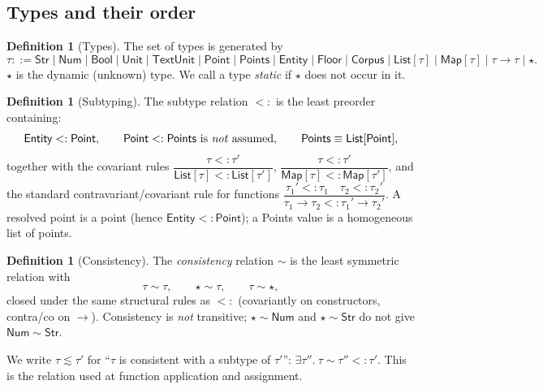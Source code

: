 \documentclass[11pt,a4paper]{article}
\theoremstyle{plain}
\theoremstyle{definition}
\newtheorem{definition}[theorem]{Definition}
\theoremstyle{remark}
\newcommand{\dyn}{\star}                                  %
\newcommand{\subtype}{<:}
\newcommand{\consistent}{\sim}
\newcommand{\jspace}{\qquad}
\begin{document}
\subsection{Types and their order}

\begin{definition}[Types]
\label{def:types}
The set of types is generated by
\[
\tau ::= \mathsf{Str}\mid\mathsf{Num}\mid\mathsf{Bool}\mid\mathsf{Unit}
        \mid \mathsf{TextUnit} \mid \mathsf{Point}\mid\mathsf{Points}
        \mid\mathsf{Entity}\mid\mathsf{Floor}\mid\mathsf{Corpus}
        \mid \mathsf{List}[\tau]\mid\mathsf{Map}[\tau]\mid \tau\to\tau \mid
        \dyn.
\]
$\dyn$ is the dynamic (unknown) type. We call a type \emph{static} if $\dyn$
does not occur in it.
\end{definition}

\begin{definition}[Subtyping]
\label{def:subtype}
The subtype relation $\subtype$ is the least preorder containing:
\[
\mathsf{Entity}\subtype\mathsf{Point}, \jspace
\mathsf{Point}\subtype\mathsf{Points}\ \text{is \emph{not} assumed},\jspace
\mathsf{Points} \equiv \mathsf{List}[\mathsf{Point}],
\]
together with the covariant rules
$\dfrac{\tau\subtype\tau'}{\mathsf{List}[\tau]\subtype\mathsf{List}[\tau']}$,
$\dfrac{\tau\subtype\tau'}{\mathsf{Map}[\tau]\subtype\mathsf{Map}[\tau']}$, and
the standard contravariant/covariant rule for functions
$\dfrac{\tau_1'\subtype\tau_1 \quad \tau_2\subtype\tau_2'}
       {\tau_1\to\tau_2 \subtype \tau_1'\to\tau_2'}$.
A resolved point is a point (hence $\mathsf{Entity}\subtype\mathsf{Point}$); a
\textsf{Points} value is a homogeneous list of points.
\end{definition}

\begin{definition}[Consistency]
\label{def:consistency}
The \emph{consistency} relation $\consistent$ is the least symmetric relation
with
\[
\tau\consistent\tau,\jspace \dyn\consistent\tau,\jspace \tau\consistent\dyn,
\]
closed under the same structural rules as $\subtype$ (covariantly on
constructors, contra/co on $\to$). Consistency is \emph{not} transitive;
$\dyn\consistent\mathsf{Num}$ and $\dyn\consistent\mathsf{Str}$ do not give
$\mathsf{Num}\consistent\mathsf{Str}$.
\end{definition}

We write $\tau \lesssim \tau'$ for ``$\tau$ is consistent with a subtype of
$\tau'$'': $\exists\tau''.\ \tau\consistent\tau''\subtype\tau'$. This is the
relation used at function application and assignment.
\end{document}
